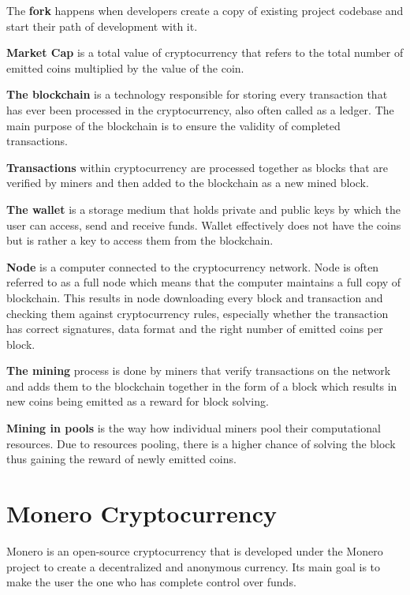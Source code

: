 \documentclass[
  printed, %
  table,   %
  lof,     %
  lot,     %
           oneside, color
]{fithesis3}
\begin{document}
The \textbf{fork} happens when developers create a copy of existing project codebase and start their path of development with it. 

\textbf{Market Cap} is a total value of cryptocurrency that refers to the total number of emitted coins multiplied by the value of the coin.

\textbf{The blockchain} is a technology responsible for storing every transaction that has ever been processed in the cryptocurrency, also often called as a ledger. The main purpose of the blockchain is to ensure the validity of completed transactions.

\textbf{Transactions} within cryptocurrency are processed together as blocks that are verified by miners and then added to the blockchain as a new mined block.

\textbf{The wallet} is a storage medium that holds private and public keys by which the user can access, send and receive funds. Wallet effectively does not have the coins but is rather a key to access them from the blockchain.

\textbf{Node} is a computer connected to the cryptocurrency network. Node is often referred to as a full node which means that the computer maintains a full copy of blockchain. This results in node downloading every block and transaction and checking them against cryptocurrency rules, especially whether the transaction has correct signatures, data format and the right number of emitted coins per block.

\textbf{The mining} process is done by miners that verify transactions on the network and adds them to the blockchain together in the form of a block which results in new coins being emitted as a reward for block solving.

\textbf{Mining in pools} is the way how individual miners pool their computational resources. Due to resources pooling, there is a higher chance of solving the block thus gaining the reward of newly emitted coins. %

\chapter{Monero Cryptocurrency}
Monero is an open-source cryptocurrency that is developed under the Monero project to create a decentralized and anonymous currency. Its main goal is to make the user the one who has complete control over funds.
\end{document}
